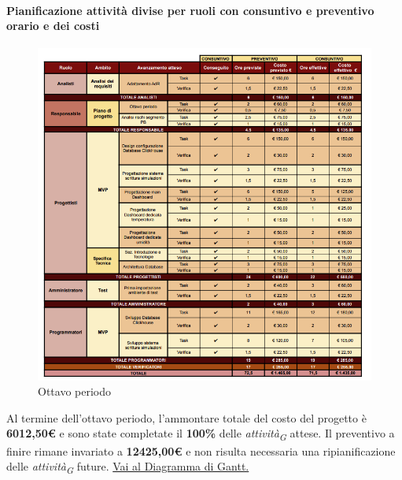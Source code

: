\paragraph{Pianificazione attività divise per ruoli con consuntivo e preventivo orario e dei costi}

\vspace{0.4cm}

\begin{figure}[H]
    \centering
    \includegraphics[height=1.1\textwidth]{../Images/tabG8.PNG}
    \caption{Ottavo periodo}
    \label{fig:Ottavo_periodo}
\end{figure}

Al termine dell'ottavo periodo, l'ammontare totale del costo del progetto è \textbf{6012,50\euro} e sono state completate il \textbf{100\%} delle \textit{attività}\textsubscript{\textit{G}} attese.
Il preventivo a finire rimane invariato a \textbf{12425,00\euro} e non risulta necessaria una ripianificazione delle \textit{attività}\textsubscript{\textit{G}} future.
\href{https://github.com/orgs/ByteOps-swe/projects/3/views/1?sortedBy%5Bdirection%5D=asc&sortedBy%5BcolumnId%5D=64182560}{Vai al Diagramma di Gantt.}

